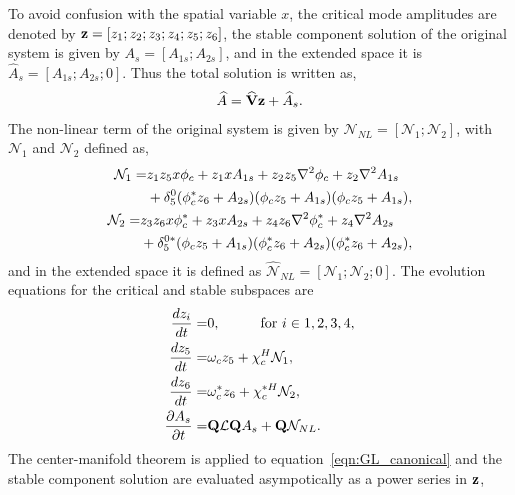 To avoid confusion with the spatial variable $x$, the critical mode amplitudes are denoted by $\mathbf{z} = [z_{1};z_{2};z_{3};z_{4};z_{5};z_{6}]$, the stable component solution of the original system is given by $A_{s} = [A_{1s}; A_{2s}]$, and in the extended space it is $\widehat{A}_{s} = [A_{1s}; A_{2s}; 0]$. Thus the total solution is written as,
\begin{eqnarray}
	\widehat{A} = \widehat{\mathbf{V}}\mathbf{z} + \widehat{A}_{s}. \nonumber
\end{eqnarray}
The non-linear term of the original system is given by $\mathcal{N}_{NL} =  [\mathcal{N}_{1}; \mathcal{N}_{2}]$, with $\mathcal{N}_{1}$ and $\mathcal{N}_{2}$ defined as, 
\begin{align}
 	\begin{split}
 		\mathcal{N}_{1} =&
			z_{1}z_{5}x\phi_{c} + z_{1}xA_{1s} + z_{2}z_{5}\nabla^{2}\phi_{c} + z_{2}\nabla^{2} A_{1s} \\
			 &+ \delta^{0}_{5}(\phi^{*}_{c}z_{6} +  A_{2s}) (\phi_{c}z_{5} +  A_{1s})(\phi_{c}z_{5} +  A_{1s}),
	\end{split} \nonumber \\
	\begin{split}
		\mathcal{N}_{2} =&
		z_{3}z_{6}x\phi^{*}_{c} + z_{3}xA_{2s} + z_{4}z_{6}\nabla^{2}\phi^{*}_{c} + z_{4}\nabla^{2} A_{2s} \\
		&+ \delta^{0*}_{5}(\phi_{c}z_{5} +  A_{1s}) (\phi^{*}_{c}z_{6} +  A_{2s})(\phi^{*}_{c}z_{6} +  A_{2s}),
	\end{split} \nonumber
\end{align}
and in the extended space it is defined as $\mathcal{\widehat{N}}_{NL} =  [\mathcal{N}_{1}; \mathcal{N}_{2}; 0]$. The evolution equations for the critical and stable subspaces are
\begin{subequations}
	\label{eqn:GL_canonical}
\begin{align}
	\dfrac{d z_{i}}{dt}	=& 0, \hspace{10mm} \text{for } i \in {1,2,3,4},\\
	\dfrac{d z_{5}}{dt}	=& \omega_{c}z_{5} + \chi_{c}^{H}\mathcal{N}_{1},  \\
	\dfrac{d z_{6}}{dt}	=& \omega^{*}_{c}z_{6} + \chi^{*H}_{c}\mathcal{N}_{2},  \\
	\dfrac{\partial A_{s}}{\partial t} =& \mathbf{Q}\mathcal{L}\mathbf{Q}A_{s} + \mathbf{Q}\mathcal{N}_{NL}.
\end{align}
\end{subequations}
The center-manifold theorem is applied to equation~\eqref{eqn:GL_canonical} and the stable component solution are evaluated asympotically as a power series in $\mathbf{z}$, 
